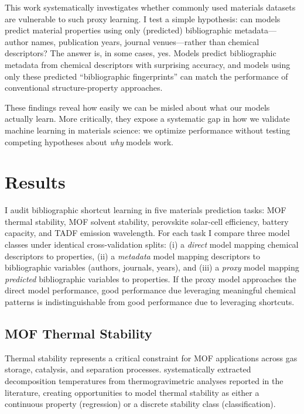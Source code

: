 \documentclass[11pt, oneside]{article}
\begin{document}
This work systematically investigates whether commonly used materials datasets are vulnerable to such proxy learning. 
I test a simple hypothesis: can models predict material properties using only (predicted) bibliographic metadata---author names, publication years, journal venues---rather than chemical descriptors? 
The answer is, in some cases, yes. 
Models predict bibliographic metadata from chemical descriptors with surprising accuracy, and models using only these predicted \enquote{bibliographic fingerprints} can match the performance of conventional structure-property approaches. 

These findings reveal how easily we can be misled about what our models actually learn. 
More critically, they expose a systematic gap in how we validate machine learning in materials science: we optimize performance without testing competing hypotheses about \emph{why} models work. 
  


\section{Results}

I audit bibliographic shortcut learning in five materials prediction tasks: MOF thermal stability, MOF solvent stability, perovskite solar-cell efficiency, battery capacity, and TADF emission wavelength. 
For each task I compare three model classes under identical cross-validation splits: (i) a \emph{direct} model mapping chemical descriptors to properties, (ii) a \emph{metadata} model mapping descriptors to bibliographic variables (authors, journals, years), and (iii) a \emph{proxy} model mapping \emph{predicted} bibliographic variables to properties.
If the proxy model approaches the direct model performance, good performance due leveraging meaningful chemical patterns is indistinguishable from good performance due to leveraging shortcuts.




\subsection{MOF Thermal Stability}

Thermal stability represents a critical constraint for MOF applications across gas storage, catalysis, and separation processes.\autocite{Kalmutzki2018} 
\textcite{Nandy2022} systematically extracted decomposition temperatures from thermogravimetric analyses reported in the literature, creating opportunities to model thermal stability as either a continuous property (regression) or a discrete stability class (classification).\autocite{Nandy2021}
\end{document}
